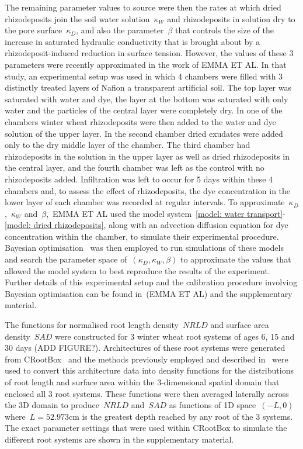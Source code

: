 \documentclass[11pt,a4paper]{article}
\numberwithin{equation}{section}
\begin{document}
The remaining parameter values to source were then the rates at which dried rhizodeposits join the soil water solution~$\kappa_W$ and rhizodeposits in solution dry to the pore surface~$\kappa_D$, and also the parameter~$\beta$ that controls the size of the increase in saturated hydraulic conductivity that is brought about by a rhizodeposit-induced reduction in surface tension. However, the values of these 3 parameters were recently approximated in the work of EMMA ET AL. In that study, an experimental setup was used in which 4 chambers were filled with 3 distinctly treated layers of Nafion a transparent artificial soil. The top layer was saturated with water and dye, the layer at the bottom was saturated with only water and the particles of the central layer were completely dry. In one of the chambers winter wheat rhizodeposits were then added to the water and dye solution of the upper layer. In the second chamber dried exudates were added only to the dry middle layer of the chamber. The third chamber had rhizodeposits in the solution in the upper layer as well as dried rhizodeposits in the central layer, and the fourth chamber was left as the control with no rhizodeposits added. Infiltration was left to occur for 5 days within these 4 chambers and, to assess the effect of rhizodeposits, the dye concentration in the lower layer of each chamber was recorded at regular intervals. To approximate~$\kappa_D$,~$\kappa_W$ and~$\beta$,~EMMA ET AL used the model system~\eqref{model: water transport}-\eqref{model: dried rhizodeposits}, along with an advection diffusion equation for dye concentration within the chamber, to simulate their experimental procedure. Bayesian optimisation~\cite{brochu2010tutorial} was then employed to run simulations of these models and search the parameter space of~$(\kappa_D,\kappa_W, \beta)$ to approximate the values that allowed the model system to best reproduce the results of the experiment. Further details of this experimental setup and the calibration procedure involving Bayesian optimisation can be found in~(EMMA ET AL) and the supplementary material.

The functions for normalised root length density~$NRLD$ and surface area density~$SAD$ were constructed for 3 winter wheat root systems of ages 6, 15 and 30 days (ADD FIGURE?). Architectures of these root systems were generated from CRootBox~\citep{schnepf2018crootbox} and the methods previously employed and described in~\citep{mair2022model, mair2023can, mair2023mathematical} were used to convert this architecture data into density functions for the distributions of root length and surface area within the 3-dimensional spatial domain that enclosed all 3 root systems. These functions were then averaged laterally across the 3D domain to produce~$NRLD$ and~$SAD$ as functions of 1D space~$(-L,0)$ where~$L = 52.973\text{cm}$ is the greatest depth reached by any root of the 3 systems. The exact parameter settings that were used within CRootBox to simulate the different root systems are shown in the supplementary material. 
\end{document}
